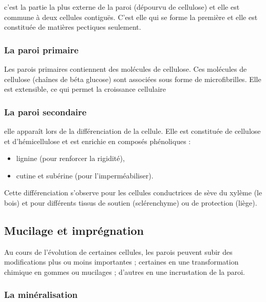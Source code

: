 \documentclass[
]{book}
\providecommand{\tightlist}{%
  \setlength{\itemsep}{0pt}\setlength{\parskip}{0pt}}
\begin{document}
c'est la partie la plus externe de la paroi (dépourvu de cellulose) et elle est commune à deux cellules contiguës. C'est elle qui se forme la première et elle est constituée de matières pectiques seulement.

\hypertarget{la-paroi-primaire}{%
\subsubsection{La paroi primaire}\label{la-paroi-primaire}}

Les parois primaires contiennent des molécules de cellulose. Ces molécules de cellulose (chaînes de béta glucose) sont associées sous forme de microfibrilles. Elle est extensible, ce qui permet la croissance cellulaire

\hypertarget{la-paroi-secondaire}{%
\subsubsection{La paroi secondaire}\label{la-paroi-secondaire}}

elle apparaît lors de la différenciation de la cellule. Elle est constituée de cellulose et d'hémicellulose et est enrichie en composés phénoliques :

\begin{itemize}
\tightlist
\item
  lignine (pour renforcer la rigidité),
\item
  cutine et subérine (pour l'imperméabiliser).
\end{itemize}

Cette différenciation s'observe pour les cellules conductrices de sève du xylème (le bois) et pour différents tissus de soutien (sclérenchyme) ou de protection (liège).

\hypertarget{mucilage-et-impruxe9gnation}{%
\subsection{Mucilage et imprégnation}\label{mucilage-et-impruxe9gnation}}

Au cours de l'évolution de certaines cellules, les parois peuvent subir des modifications plus ou moins importantes ; certaines en une transformation chimique en gommes ou mucilages ; d'autres en une incrustation de la paroi.

\hypertarget{la-minuxe9ralisation}{%
\subsubsection{La minéralisation}\label{la-minuxe9ralisation}}
\end{document}
